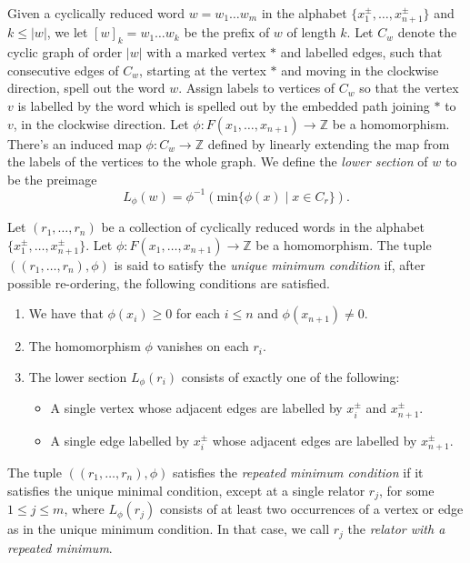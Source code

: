 Given a cyclically reduced word $w = w_1\ldots w_m$ in the alphabet $\{x_1^{\pm}, \ldots, x_{n+1}^{\pm}\}$ and $k \leq |w|$, we let $[w]_k = w_1 \ldots w_k$ be the prefix of $w$ of length $k$. Let $C_w$ denote the cyclic graph of order $|w|$ with a marked vertex $\ast$ and labelled edges, such that consecutive edges of $C_w$, starting at the vertex $\ast$ and moving in the clockwise direction, spell out the word $w$. Assign labels to vertices of $C_w$ so that the vertex $v$ is labelled by the word which is spelled out by the embedded path joining $\ast$ to $v$, in the clockwise direction. Let $\phi \colon F(x_1, \ldots, x_{n+1}) \to \mathbb{Z}$ be a homomorphism. There's an induced map $\phi \colon C_w \to \mathbb{Z}$ defined by linearly extending the map from the labels of the vertices to the whole graph. We define the \emph{lower section} of $w$ to be the preimage 
\[L_{\phi}(w) = \phi^{-1}(\mathrm{min}\{\phi(x) \mid x \in C_r\}).\]

Let $(r_1, \ldots, r_n)$ be a collection of cyclically reduced words in the alphabet $\{x_1^{\pm}, \ldots, x_{n+1}^{\pm}\}$. Let $\phi \colon F(x_1, \ldots, x_{n+1}) \to \mathbb{Z}$ be a homomorphism. The tuple $((r_1, \ldots, r_n), \phi)$ is said to satisfy the \emph{unique minimum condition} if, after possible re-ordering, the following conditions are satisfied.
\begin{enumerate}
    \item We have that $\phi(x_i) \geq 0$ for each $i \leq n$ and $\phi(x_{n+1}) \neq 0$. 
    \item The homomorphism $\phi$ vanishes on each $r_i$.
    \item The lower section $L_{\phi}(r_i)$ consists of exactly one of the following:
\begin{itemize}
    \item A single vertex whose adjacent edges are labelled by $x_i^{\pm}$ and $x_{n+1}^{\pm}$.
    \item A single edge labelled by $x_i^{\pm}$ whose adjacent edges are labelled by $x_{n+1}^{\pm}$.
\end{itemize}
\end{enumerate}
The tuple $((r_1, \ldots, r_n), \phi)$ satisfies the \emph{repeated minimum condition} if it satisfies the unique minimal condition, except at a single relator $r_j$, for some $1 \leq j \leq m$, where $L_{\phi}(r_j)$ consists of at least two occurrences of a vertex or edge as in the unique minimum condition. In that case, we call $r_j$ the \emph{relator with a repeated minimum}.

